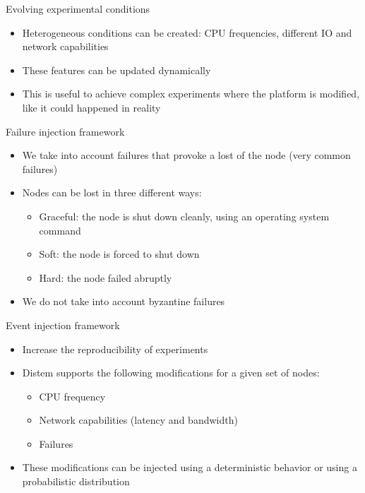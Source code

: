 \documentclass[11pt,xcolor=dvipsnames,presentation]{beamer}
\begin{document}
\begin{frame}[label=sec-2-0-4]{Evolving experimental conditions}
\begin{itemize}
\item Heterogeneous conditions can be created: CPU frequencies,
different IO and network capabilities

\item These features can be updated dynamically

\item This is useful to achieve complex experiments where the platform is modified,
like it could happened in reality
\end{itemize}
\end{frame}

\begin{frame}[label=sec-2-0-5]{Failure injection framework}

\begin{itemize}
\item We take into account failures that provoke a lost of the node (very common failures)

\item Nodes can be lost in three different ways:

\begin{itemize}
\item \alert{Graceful}: the node is shut down cleanly, using an operating system command
\item \alert{Soft}: the node is forced to shut down
\item \alert{Hard}: the node failed abruptly
\end{itemize}

\item We do not take into account byzantine failures
\end{itemize}
\end{frame}

\begin{frame}[label=sec-2-0-6]{Event injection framework}
\begin{itemize}
\item Increase the reproducibility of experiments
\item Distem supports the following modifications for a given set of nodes:
\begin{itemize}
\item CPU frequency
\item Network capabilities (latency and bandwidth)
\item Failures
\end{itemize}
\item These modifications can be injected using a deterministic behavior or using
a probabilistic distribution
\end{itemize}
\end{frame}
\end{document}
